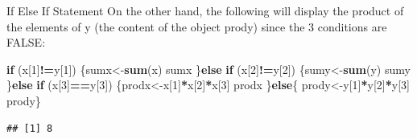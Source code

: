 \documentclass[
  ignorenonframetext,
]{beamer}
\newenvironment{Shaded}{\begin{snugshade}}{\end{snugshade}}
\newcommand{\ControlFlowTok}[1]{\textcolor[rgb]{0.13,0.29,0.53}{\textbf{#1}}}
\newcommand{\DecValTok}[1]{\textcolor[rgb]{0.00,0.00,0.81}{#1}}
\newcommand{\FunctionTok}[1]{\textcolor[rgb]{0.13,0.29,0.53}{\textbf{#1}}}
\newcommand{\NormalTok}[1]{#1}
\newcommand{\OtherTok}[1]{\textcolor[rgb]{0.56,0.35,0.01}{#1}}
\newcommand{\SpecialCharTok}[1]{\textcolor[rgb]{0.81,0.36,0.00}{\textbf{#1}}}
\begin{document}
\begin{frame}[fragile]{If Else If Statement}
\protect\hypertarget{if-else-if-statement-2}{}
On the other hand, the following will display the product of the
elements of y (the content of the object prody) since the 3 conditions
are FALSE:

\small

\begin{Shaded}
\begin{Highlighting}[]
\ControlFlowTok{if}\NormalTok{ (x[}\DecValTok{1}\NormalTok{]}\SpecialCharTok{!=}\NormalTok{y[}\DecValTok{1}\NormalTok{])}
\NormalTok{  \{sumx}\OtherTok{\textless{}{-}}\FunctionTok{sum}\NormalTok{(x)}
\NormalTok{   sumx}
\NormalTok{  \}}\ControlFlowTok{else} \ControlFlowTok{if}\NormalTok{ (x[}\DecValTok{2}\NormalTok{]}\SpecialCharTok{!=}\NormalTok{y[}\DecValTok{2}\NormalTok{])}
\NormalTok{   \{sumy}\OtherTok{\textless{}{-}}\FunctionTok{sum}\NormalTok{(y)}
\NormalTok{   sumy}
\NormalTok{   \}}\ControlFlowTok{else} \ControlFlowTok{if}\NormalTok{ (x[}\DecValTok{3}\NormalTok{]}\SpecialCharTok{==}\NormalTok{y[}\DecValTok{3}\NormalTok{])}
\NormalTok{   \{prodx}\OtherTok{\textless{}{-}}\NormalTok{x[}\DecValTok{1}\NormalTok{]}\SpecialCharTok{*}\NormalTok{x[}\DecValTok{2}\NormalTok{]}\SpecialCharTok{*}\NormalTok{x[}\DecValTok{3}\NormalTok{]}
\NormalTok{   prodx}
\NormalTok{   \}}\ControlFlowTok{else}\NormalTok{\{}
\NormalTok{   prody}\OtherTok{\textless{}{-}}\NormalTok{y[}\DecValTok{1}\NormalTok{]}\SpecialCharTok{*}\NormalTok{y[}\DecValTok{2}\NormalTok{]}\SpecialCharTok{*}\NormalTok{y[}\DecValTok{3}\NormalTok{]}
\NormalTok{   prody\}}
\end{Highlighting}
\end{Shaded}

\begin{verbatim}
## [1] 8
\end{verbatim}

\normalsize
\end{frame}
\end{document}

